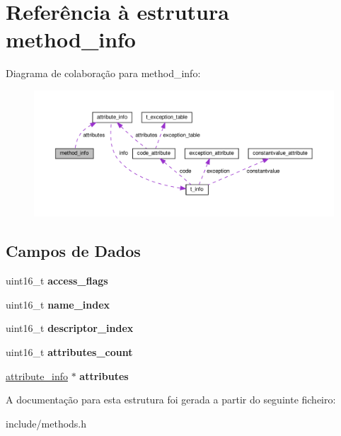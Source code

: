 \hypertarget{structmethod__info}{}\section{Referência à estrutura method\+\_\+info}
\label{structmethod__info}


Diagrama de colaboração para method\+\_\+info\+:
\nopagebreak
\begin{figure}[H]
\begin{center}
\leavevmode
\includegraphics[width=350pt]{structmethod__info__coll__graph}
\end{center}
\end{figure}
\subsection*{Campos de Dados}
\begin{DoxyCompactItemize}
\item 
\mbox{\label{structmethod__info_a8fc68aba419f2617deda879c467f5410}} 
uint16\+\_\+t {\bfseries access\+\_\+flags}
\item 
\mbox{\label{structmethod__info_af0ba3d6d566432e74eed5c37cd998c14}} 
uint16\+\_\+t {\bfseries name\+\_\+index}
\item 
\mbox{\label{structmethod__info_abccd6a5202d4c0ee1be6b89692d0352a}} 
uint16\+\_\+t {\bfseries descriptor\+\_\+index}
\item 
\mbox{\label{structmethod__info_a9e711e4dfb8181f7dce16c6f640ba734}} 
uint16\+\_\+t {\bfseries attributes\+\_\+count}
\item 
\mbox{\label{structmethod__info_a8ce4caaa03680c91f548558a38647ad8}} 
\hyperlink{structattribute__info}{attribute\+\_\+info} $\ast$ {\bfseries attributes}
\end{DoxyCompactItemize}


A documentação para esta estrutura foi gerada a partir do seguinte ficheiro\+:\begin{DoxyCompactItemize}
\item 
include/methods.\+h\end{DoxyCompactItemize}
